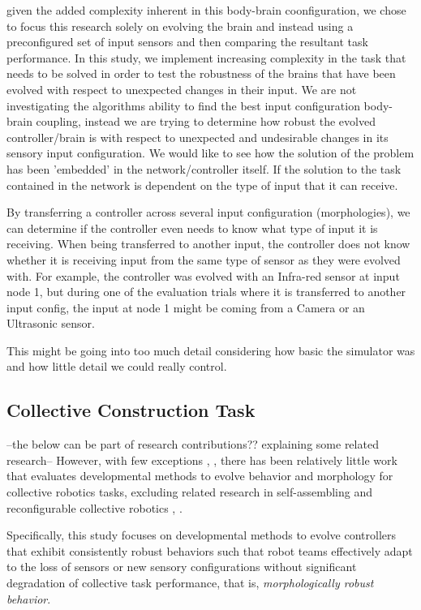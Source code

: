 given the added complexity inherent in this body-brain coonfiguration, we chose to focus this research solely on evolving the brain and instead using a preconfigured set of input sensors and then comparing the resultant task performance. In this study, we implement increasing complexity in the task that needs to be solved in order to test the robustness of the brains that have been evolved with respect to unexpected changes in their input. We are not investigating the algorithms ability to find the best input configuration body-brain coupling, instead we are trying to determine how robust the evolved controller/brain is with respect to unexpected and undesirable changes in its sensory input configuration. We would like to see how the solution of the problem has been 'embedded' in the network/controller itself. If the solution to the task contained in the network is dependent on the type of input that it can receive.

By transferring a controller across several input configuration (morphologies), we can determine if the controller even needs to know what type of input it is receiving. When being transferred to another input, the controller does not know whether it is receiving input from the same type of sensor as they were evolved with. For example, the controller was evolved with an Infra-red sensor at input node 1, but during one of the evaluation trials where it is transferred to another input config, the input at node 1 might be coming from a Camera or an Ultrasonic sensor.

This might be going into too much detail considering how basic the simulator was and how little detail we could really control.

\subsection{Collective Construction Task}


--the below can be part of research contributions?? explaining some related research--
However, with few exceptions \cite{AsaiArita2003}, \cite{WatsonNitschke2015SSCI}, \cite{HewlandNitschke2015}
there has been relatively little work that evaluates developmental methods to evolve behavior and morphology
for collective robotics tasks, excluding related research in self-assembling and
reconfigurable collective robotics \cite{OGradyDorigo2012}, \cite{RubensteinCornejoNagpal2014}.

Specifically, this study focuses on developmental methods to evolve controllers that exhibit consistently
robust behaviors such that robot teams effectively adapt to the loss of sensors or new sensory configurations
without significant degradation of collective task performance, that is, \textit{morphologically robust behavior}.





